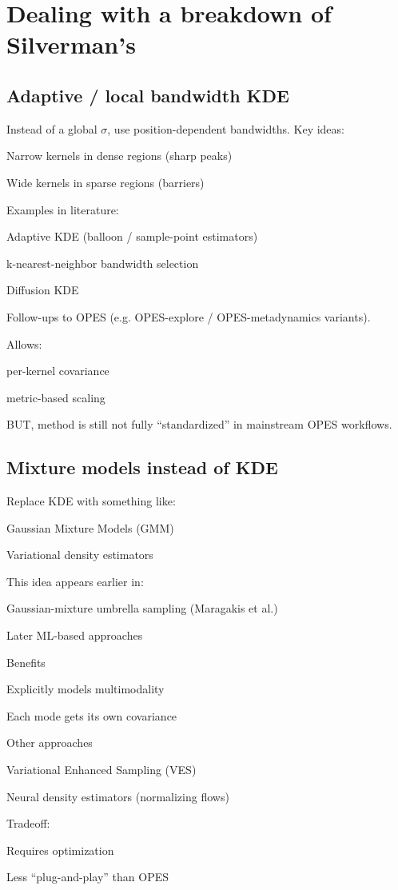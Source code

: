 \section{Dealing with a breakdown of Silverman's}

\subsection{Adaptive / local bandwidth KDE}
Instead of a global $\sigma$, use position-dependent bandwidths.  Key ideas:
\begin{itemizec}
    \item Narrow kernels in dense regions (sharp peaks)
    \item Wide kernels in sparse regions (barriers)
    \item Examples in literature:
    \item Adaptive KDE (balloon / sample-point estimators)
    \item k-nearest-neighbor bandwidth selection
    \item Diffusion KDE
\end{itemizec}
Follow-ups to OPES (e.g. OPES-explore / OPES-metadynamics variants).

Allows:
\begin{itemizec}
    \item per-kernel covariance
    \item metric-based scaling
\end{itemizec}
BUT, method is still not fully “standardized” in mainstream OPES workflows.

\subsection{Mixture models instead of KDE}
Replace KDE with something like:
\begin{itemizec}
    \item Gaussian Mixture Models (GMM)
    \item Variational density estimators
\end{itemizec}
This idea appears earlier in:
\begin{itemizec}
    \item Gaussian-mixture umbrella sampling (Maragakis et al.)
    \item Later ML-based approaches
\end{itemizec}
Benefits
\begin{itemizec}
    \item Explicitly models multimodality
    \item Each mode gets its own covariance
\end{itemizec}
Other approaches
\begin{itemizec}
    \item Variational Enhanced Sampling (VES)
    \item Neural density estimators (normalizing flows)
\end{itemizec}
Tradeoff:
\begin{itemizec}
    \item Requires optimization
    \item Less “plug-and-play” than OPES
\end{itemizec}


